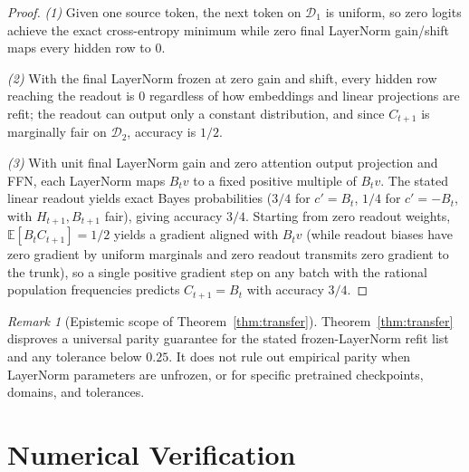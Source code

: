 \documentclass[11pt]{article}
\theoremstyle{plain}
\theoremstyle{definition}
\theoremstyle{remark}
\newtheorem{remark}{Remark}
\begin{document}
\begin{proof}
\emph{(1)} Given one source token, the next token on $\mathcal{D}_1$ is uniform, so zero logits achieve the exact cross-entropy minimum while zero final LayerNorm gain/shift maps every hidden row to $0$.

\emph{(2)} With the final LayerNorm frozen at zero gain and shift, every hidden row reaching the readout is $0$ regardless of how embeddings and linear projections are refit; the readout can output only a constant distribution, and since $C_{t+1}$ is marginally fair on $\mathcal{D}_2$, accuracy is $1/2$.

\emph{(3)} With unit final LayerNorm gain and zero attention output projection and FFN, each LayerNorm maps $B_t v$ to a fixed positive multiple of $B_t v$. The stated linear readout yields exact Bayes probabilities ($3/4$ for $c' = B_t$, $1/4$ for $c' = -B_t$, with $H_{t+1}, B_{t+1}$ fair), giving accuracy $3/4$. Starting from zero readout weights, $\mathbb{E}[B_t C_{t+1}] = 1/2$ yields a gradient aligned with $B_t v$ (while readout biases have zero gradient by uniform marginals and zero readout transmits zero gradient to the trunk), so a single positive gradient step on any batch with the rational population frequencies predicts $C_{t+1} = B_t$ with accuracy $3/4$.
\end{proof}

\begin{remark}[Epistemic scope of Theorem~\ref{thm:transfer}]
Theorem~\ref{thm:transfer} disproves a universal parity guarantee for the stated frozen-LayerNorm refit list and any tolerance below $0.25$. It does not rule out empirical parity when LayerNorm parameters are unfrozen, or for specific pretrained checkpoints, domains, and tolerances.
\end{remark}

\section{Numerical Verification}
\end{document}
